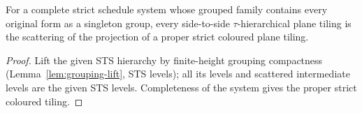 \begin{lemma}\label{lem:strict-complete}
For a complete strict schedule system whose grouped family contains every
original form as a singleton group, every side-to-side $\tau$-hierarchical
plane tiling is the scattering of the projection of a proper strict coloured
plane tiling.
\end{lemma}
\begin{proof}
Lift the given STS hierarchy by finite-height grouping compactness
(Lemma~\ref{lem:grouping-lift}, STS levels); all its levels and scattered
intermediate levels are the given STS levels. Completeness of the system
gives the proper strict coloured tiling.
\end{proof}

